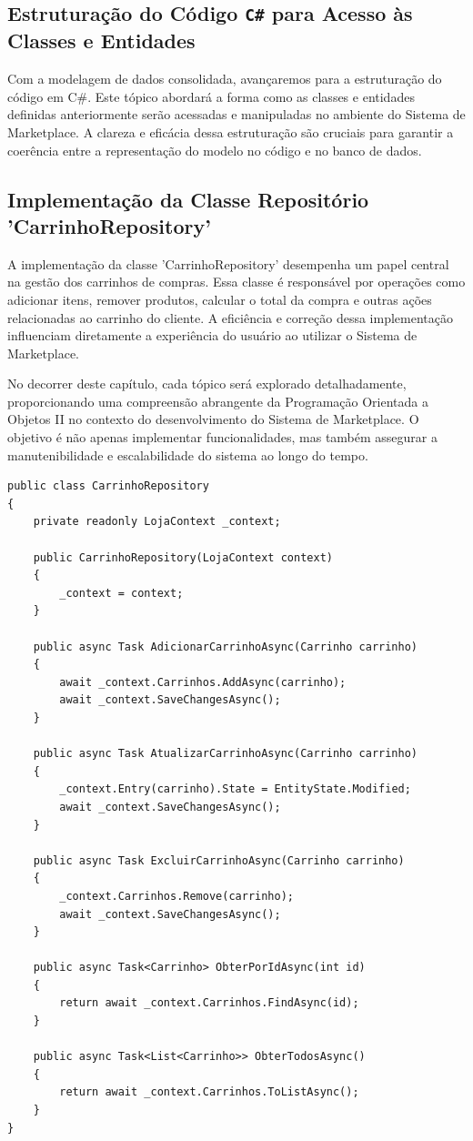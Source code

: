 \documentclass[
	12pt,				%
	openright,			%
	twoside,			%
	a4paper,			%
	english,			%
	brazil				%
	]{abntex2}
\begin{document}
\subsection{Estruturação do Código \texttt{C\#} para Acesso às Classes e Entidades}

Com a modelagem de dados consolidada, avançaremos para a estruturação do código em C\#. Este tópico abordará a forma como as classes e entidades definidas anteriormente serão acessadas e manipuladas no ambiente do Sistema de Marketplace. A clareza e eficácia dessa estruturação são cruciais para garantir a coerência entre a representação do modelo no código e no banco de dados.

\subsection{Implementação da Classe Repositório 'CarrinhoRepository'}

A implementação da classe 'CarrinhoRepository' desempenha um papel central na gestão dos carrinhos de compras. Essa classe é responsável por operações como adicionar itens, remover produtos, calcular o total da compra e outras ações relacionadas ao carrinho do cliente. A eficiência e correção dessa implementação influenciam diretamente a experiência do usuário ao utilizar o Sistema de Marketplace.

No decorrer deste capítulo, cada tópico será explorado detalhadamente, proporcionando uma compreensão abrangente da Programação Orientada a Objetos II no contexto do desenvolvimento do Sistema de Marketplace. O objetivo é não apenas implementar funcionalidades, mas também assegurar a manutenibilidade e escalabilidade do sistema ao longo do tempo.

\begin{lstlisting}[language={[Sharp]C}, caption=DataBase, label=lst:basedata]
public class CarrinhoRepository
{
    private readonly LojaContext _context;

    public CarrinhoRepository(LojaContext context)
    {
        _context = context;
    }

    public async Task AdicionarCarrinhoAsync(Carrinho carrinho)
    {
        await _context.Carrinhos.AddAsync(carrinho);
        await _context.SaveChangesAsync();
    }

    public async Task AtualizarCarrinhoAsync(Carrinho carrinho)
    {
        _context.Entry(carrinho).State = EntityState.Modified;
        await _context.SaveChangesAsync();
    }

    public async Task ExcluirCarrinhoAsync(Carrinho carrinho)
    {
        _context.Carrinhos.Remove(carrinho);
        await _context.SaveChangesAsync();
    }

    public async Task<Carrinho> ObterPorIdAsync(int id)
    {
        return await _context.Carrinhos.FindAsync(id);
    }

    public async Task<List<Carrinho>> ObterTodosAsync()
    {
        return await _context.Carrinhos.ToListAsync();
	}
}
\end{lstlisting}
\end{document}
